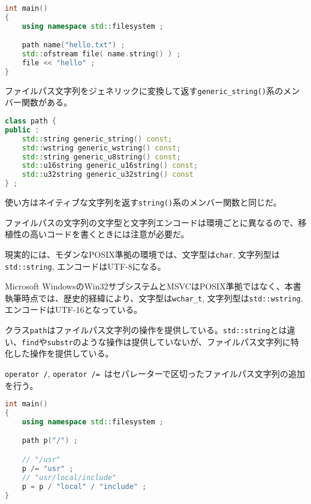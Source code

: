 \begin{lstlisting}[language=C++]
int main()
{
    using namespace std::filesystem ;

    path name("hello.txt") ;
    std::ofstream file( name.string() ) ;
    file << "hello" ;
}
\end{lstlisting}

ファイルパス文字列をジェネリックに変換して返す\lstinline!generic_string()!系のメンバー関数がある。

\begin{lstlisting}[language=C++]
class path {
public :
    std::string generic_string() const;
    std::wstring generic_wstring() const;
    std::string generic_u8string() const;
    std::u16string generic_u16string() const;
    std::u32string generic_u32string() const
} ;
\end{lstlisting}

使い方はネイティブな文字列を返す\lstinline!string()!系のメンバー関数と同じだ。

ファイルパスの文字列の文字型と文字列エンコードは環境ごとに異なるので、移植性の高いコードを書くときには注意が必要だ。

現実的には、モダンなPOSIX準拠の環境では、文字型は\lstinline!char!,
文字列型は\lstinline!std::string!, エンコードはUTF-8になる。

Microsoft
WindowsのWin32サブシステムとMSVCはPOSIX準拠ではなく、本書執筆時点では、歴史的経緯により、文字型は\lstinline!wchar_t!,
文字列型は\lstinline!std::wstring!, エンコードはUTF-16となっている。

%

クラス\lstinline!path!はファイルパス文字列の操作を提供している。\lstinline!std::string!とは違い、\lstinline!find!や\lstinline!substr!のような操作は提供していないが、ファイルパス文字列に特化した操作を提供している。

\lstinline!operator /!,
\lstinline!operator /=!~はセパレーターで区切ったファイルパス文字列の追加を行う。

\begin{lstlisting}[language=C++]
int main()
{
    using namespace std::filesystem ;

    path p("/") ;

    // "/usr"
    p /= "usr" ;
    // "usr/local/include"
    p = p / "local" / "include" ;
}
\end{lstlisting}


